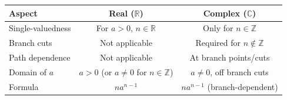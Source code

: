 \documentclass{article}
\theoremstyle{definition}
\theoremstyle{remark}
\newcommand{\C}{\mathbb{C}}
\newcommand{\R}{\mathbb{R}}
\newcommand{\Z}{\mathbb{Z}}
\begin{document}
\begin{center}
\renewcommand{\arraystretch}{1.4}
\begin{tabular}{|l|c|c|}
\hline
\textbf{Aspect} & \textbf{Real ($\R$)} & \textbf{Complex ($\C$)} \\
\hline
Single-valuedness & For $a > 0$, $n \in \R$ & Only for $n \in \Z$ \\
Branch cuts & Not applicable & Required for $n \notin \Z$ \\
Path dependence & Not applicable & At branch points/cuts \\
Domain of $a$ & $a > 0$ (or $a \neq 0$ for $n \in \Z$) & $a \neq 0$, off branch cuts \\
Formula & $n a^{n-1}$ & $n a^{n-1}$ (branch-dependent) \\
\hline
\end{tabular}
\end{center}
\end{document}

